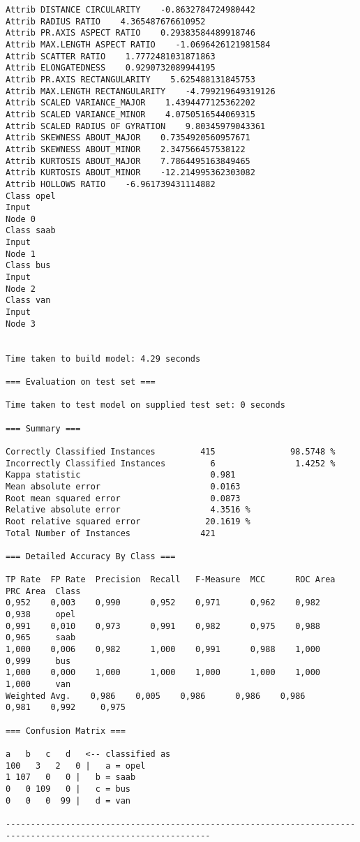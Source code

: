 \documentclass[
	article,			%
	11pt,				%
	oneside,			%
	a4paper,			%
	english,			%
	brazil,				%
	sumario=tradicional
	]{abntex2}
\begin{document}
\begin{lstlisting}
Attrib DISTANCE CIRCULARITY    -0.8632784724980442
Attrib RADIUS RATIO    4.365487676610952
Attrib PR.AXIS ASPECT RATIO    0.29383584489918746
Attrib MAX.LENGTH ASPECT RATIO    -1.0696426121981584
Attrib SCATTER RATIO    1.7772481031871863
Attrib ELONGATEDNESS    0.9290732089944195
Attrib PR.AXIS RECTANGULARITY    5.625488131845753
Attrib MAX.LENGTH RECTANGULARITY    -4.799219649319126
Attrib SCALED VARIANCE_MAJOR    1.4394477125362202
Attrib SCALED VARIANCE_MINOR    4.0750516544069315
Attrib SCALED RADIUS OF GYRATION    9.80345979043361
Attrib SKEWNESS ABOUT_MAJOR    0.7354920560957671
Attrib SKEWNESS ABOUT_MINOR    2.347566457538122
Attrib KURTOSIS ABOUT_MAJOR    7.7864495163849465
Attrib KURTOSIS ABOUT_MINOR    -12.214995362303082
Attrib HOLLOWS RATIO    -6.961739431114882
Class opel
Input
Node 0
Class saab
Input
Node 1
Class bus
Input
Node 2
Class van
Input
Node 3


Time taken to build model: 4.29 seconds

=== Evaluation on test set ===

Time taken to test model on supplied test set: 0 seconds

=== Summary ===

Correctly Classified Instances         415               98.5748 %
Incorrectly Classified Instances         6                1.4252 %
Kappa statistic                          0.981 
Mean absolute error                      0.0163
Root mean squared error                  0.0873
Relative absolute error                  4.3516 %
Root relative squared error             20.1619 %
Total Number of Instances              421     

=== Detailed Accuracy By Class ===

TP Rate  FP Rate  Precision  Recall   F-Measure  MCC      ROC Area  PRC Area  Class
0,952    0,003    0,990      0,952    0,971      0,962    0,982     0,938     opel
0,991    0,010    0,973      0,991    0,982      0,975    0,988     0,965     saab
1,000    0,006    0,982      1,000    0,991      0,988    1,000     0,999     bus
1,000    0,000    1,000      1,000    1,000      1,000    1,000     1,000     van
Weighted Avg.    0,986    0,005    0,986      0,986    0,986      0,981    0,992     0,975     

=== Confusion Matrix ===

a   b   c   d   <-- classified as
100   3   2   0 |   a = opel
1 107   0   0 |   b = saab
0   0 109   0 |   c = bus
0   0   0  99 |   d = van

---------------------------------------------------------------------------------------------------------------


\end{lstlisting}
\end{document}
